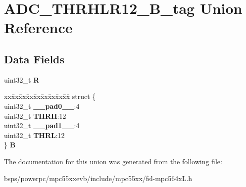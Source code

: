 \hypertarget{unionADC__THRHLR12__32B__tag}{}\section{A\+D\+C\+\_\+\+T\+H\+R\+H\+L\+R12\+\_\+B\+\_\+tag Union Reference}
\label{unionADC__THRHLR12__32B__tag}
\subsection*{Data Fields}
\begin{DoxyCompactItemize}
\item 
\mbox{\label{unionADC__THRHLR12__32B__tag_a73293dab1825000bbf11797cc3143aa6}} 
uint32\+\_\+t {\bfseries R}
\item 
\mbox{\label{unionADC__THRHLR12__32B__tag_a71e285943fe6035f98999179e371545c}} 
\begin{tabbing}
xx\=xx\=xx\=xx\=xx\=xx\=xx\=xx\=xx\=\kill
struct \{\\
\>uint32\_t {\bfseries \_\_pad0\_\_}:4\\
\>uint32\_t {\bfseries THRH}:12\\
\>uint32\_t {\bfseries \_\_pad1\_\_}:4\\
\>uint32\_t {\bfseries THRL}:12\\
\} {\bfseries B}\\

\end{tabbing}\end{DoxyCompactItemize}


The documentation for this union was generated from the following file\+:\begin{DoxyCompactItemize}
\item 
bsps/powerpc/mpc55xxevb/include/mpc55xx/fsl-\/mpc564x\+L.\+h\end{DoxyCompactItemize}
